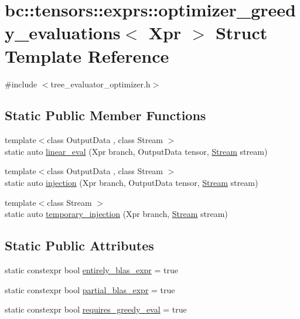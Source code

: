 \hypertarget{structbc_1_1tensors_1_1exprs_1_1optimizer__greedy__evaluations}{}\section{bc\+:\+:tensors\+:\+:exprs\+:\+:optimizer\+\_\+greedy\+\_\+evaluations$<$ Xpr $>$ Struct Template Reference}
\label{structbc_1_1tensors_1_1exprs_1_1optimizer__greedy__evaluations}


{\ttfamily \#include $<$tree\+\_\+evaluator\+\_\+optimizer.\+h$>$}

\subsection*{Static Public Member Functions}
\begin{DoxyCompactItemize}
\item 
{\footnotesize template$<$class Output\+Data , class Stream $>$ }\\static auto \hyperlink{structbc_1_1tensors_1_1exprs_1_1optimizer__greedy__evaluations_a75679d36ba105127df81bd50017b1525}{linear\+\_\+eval} (Xpr branch, Output\+Data tensor, \hyperlink{classbc_1_1streams_1_1Stream}{Stream} stream)
\item 
{\footnotesize template$<$class Output\+Data , class Stream $>$ }\\static auto \hyperlink{structbc_1_1tensors_1_1exprs_1_1optimizer__greedy__evaluations_a67fe3167e037fd1debbae090bfa09225}{injection} (Xpr branch, Output\+Data tensor, \hyperlink{classbc_1_1streams_1_1Stream}{Stream} stream)
\item 
{\footnotesize template$<$class Stream $>$ }\\static auto \hyperlink{structbc_1_1tensors_1_1exprs_1_1optimizer__greedy__evaluations_a1ebd1740233b1fd7aef179c9334d8919}{temporary\+\_\+injection} (Xpr branch, \hyperlink{classbc_1_1streams_1_1Stream}{Stream} stream)
\end{DoxyCompactItemize}
\subsection*{Static Public Attributes}
\begin{DoxyCompactItemize}
\item 
static constexpr bool \hyperlink{structbc_1_1tensors_1_1exprs_1_1optimizer__greedy__evaluations_abfc88f3d551ba6ba93a1a4bca2abe973}{entirely\+\_\+blas\+\_\+expr} = true
\item 
static constexpr bool \hyperlink{structbc_1_1tensors_1_1exprs_1_1optimizer__greedy__evaluations_a6b46128faa1df0b7e1d6446f951ebf26}{partial\+\_\+blas\+\_\+expr} = true
\item 
static constexpr bool \hyperlink{structbc_1_1tensors_1_1exprs_1_1optimizer__greedy__evaluations_a064599222d4c50a96a709aca49632108}{requires\+\_\+greedy\+\_\+eval} = true
\end{DoxyCompactItemize}


